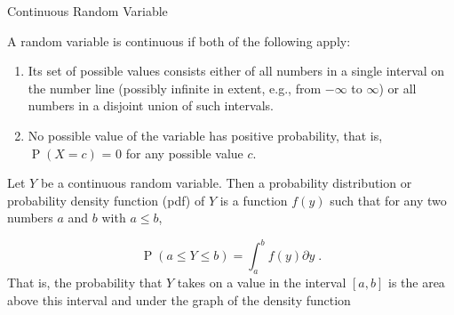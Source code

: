 \documentclass[10pt]{beamer}\usepackage[]{graphicx}\usepackage[]{color}
\newcommand{\Prob}{\operatorname{P}}
\begin{document}
\begin{frame}{Continuous Random Variable}
	
	\begin{definition}
A random variable is continuous if both of the following apply:  
\begin{enumerate}
	\item Its set of possible values consists either of all numbers in a single interval on the number line (possibly infinite in extent, e.g., from $-\infty$ to $\infty$) or all numbers in a disjoint union of such intervals.  
\item No possible value of the variable has positive probability, that is, $\Prob(X = c)$ = 0 for any possible value $c$.
\end{enumerate}

\end{definition}
	
	\pause
	
	\begin{definition}
		Let $Y$ be a continuous random variable. Then a probability distribution or probability density function (pdf) of $Y$ is a function $f(y)$ such that for any two numbers $a$ and $b$ with $a \leq b$,
		
		$$ \Prob(a \leq Y \leq b) = \int_a^b f(y) \partial y\;.$$
		That is, the probability that $Y$ takes on a value in the interval $[a, b]$ is the area
		above this interval and under the graph of the density function
	\end{definition}
	
	
\end{frame}
\end{document}
